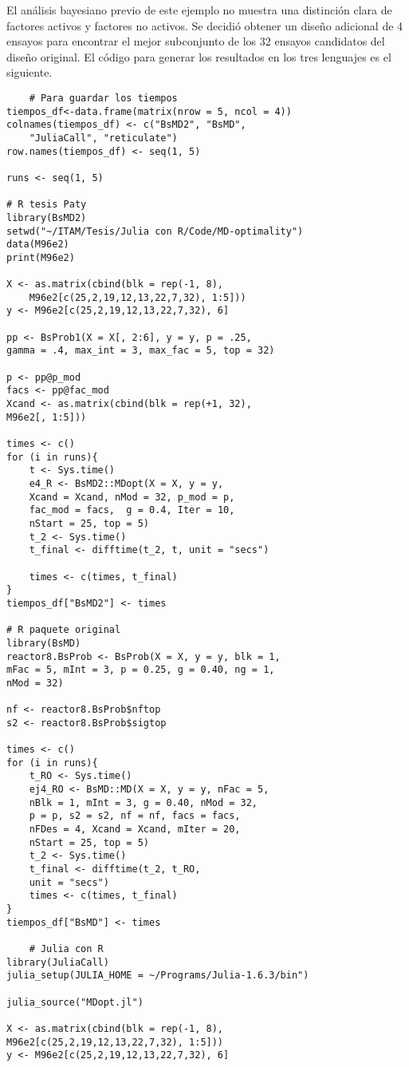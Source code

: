 El análisis bayesiano previo de este ejemplo no muestra una distinción clara de factores activos y factores no activos. Se decidió obtener un diseño adicional de 4 ensayos para encontrar el mejor subconjunto de los 32 ensayos candidatos del diseño original. El código para generar los resultados en los tres lenguajes es el siguiente.

\begin{verbatim}
	# Para guardar los tiempos
tiempos_df<-data.frame(matrix(nrow = 5, ncol = 4))
colnames(tiempos_df) <- c("BsMD2", "BsMD", 
	"JuliaCall", "reticulate")
row.names(tiempos_df) <- seq(1, 5)
	
runs <- seq(1, 5)

# R tesis Paty
library(BsMD2)
setwd("~/ITAM/Tesis/Julia con R/Code/MD-optimality")
data(M96e2)
print(M96e2)
	
X <- as.matrix(cbind(blk = rep(-1, 8), 
	M96e2[c(25,2,19,12,13,22,7,32), 1:5]))
y <- M96e2[c(25,2,19,12,13,22,7,32), 6]
	
pp <- BsProb1(X = X[, 2:6], y = y, p = .25, 
gamma = .4, max_int = 3, max_fac = 5, top = 32)
	
p <- pp@p_mod
facs <- pp@fac_mod
Xcand <- as.matrix(cbind(blk = rep(+1, 32), 
M96e2[, 1:5]))
	
times <- c()
for (i in runs){
	t <- Sys.time()
	e4_R <- BsMD2::MDopt(X = X, y = y,
	Xcand = Xcand, nMod = 32, p_mod = p, 
	fac_mod = facs,  g = 0.4, Iter = 10, 
	nStart = 25, top = 5)
	t_2 <- Sys.time()
	t_final <- difftime(t_2, t, unit = "secs")
		
	times <- c(times, t_final)
}
tiempos_df["BsMD2"] <- times
	
# R paquete original 
library(BsMD)
reactor8.BsProb <- BsProb(X = X, y = y, blk = 1, 
mFac = 5, mInt = 3, p = 0.25, g = 0.40, ng = 1, 
nMod = 32)
	
nf <- reactor8.BsProb$nftop
s2 <- reactor8.BsProb$sigtop
	
times <- c()
for (i in runs){
	t_RO <- Sys.time()
	ej4_RO <- BsMD::MD(X = X, y = y, nFac = 5, 
	nBlk = 1, mInt = 3, g = 0.40, nMod = 32, 
	p = p, s2 = s2, nf = nf, facs = facs, 
	nFDes = 4, Xcand = Xcand, mIter = 20, 
	nStart = 25, top = 5)
	t_2 <- Sys.time() 
	t_final <- difftime(t_2, t_RO, 
	unit = "secs")
	times <- c(times, t_final)
}
tiempos_df["BsMD"] <- times

	# Julia con R
library(JuliaCall)
julia_setup(JULIA_HOME = ~/Programs/Julia-1.6.3/bin")
	
julia_source("MDopt.jl")
	
X <- as.matrix(cbind(blk = rep(-1, 8), 
M96e2[c(25,2,19,12,13,22,7,32), 1:5]))
y <- M96e2[c(25,2,19,12,13,22,7,32), 6]
	

\end{verbatim}
